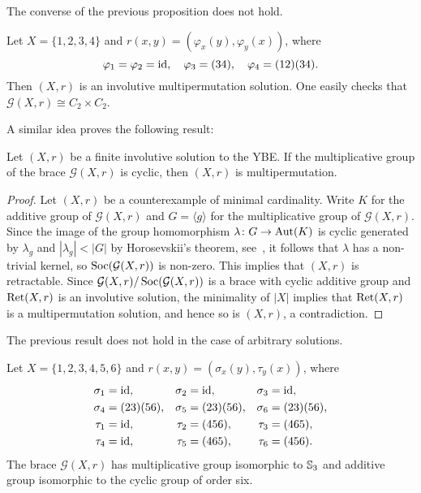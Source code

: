 The converse of the previous proposition does not hold. 

\begin{example}
	Let $X=\{1,2,3,4\}$ and $r(x,y)=(\varphi_x(y),\varphi_y(x))$, where
	\[
		\varphi_1=\varphi_2=\operatorname{id},\quad
		\varphi_3=(34),\quad
		\varphi_4=(12)(34).
 	\]
	Then $(X,r)$ is an involutive multipermutation solution. One easily checks
	that $\mathcal{G}(X,r)\cong C_2\times C_2$.
\end{example}

A similar idea proves the following result:

\begin{theorem}
\label{thm:mul_cyclic}
Let $(X,r)$ be a finite involutive solution to the YBE. If the multiplicative group 
of the brace $\mathcal{G}(X,r)$ is cyclic, then $(X,r)$ 
is multipermutation.
\end{theorem}

\begin{proof}
    Let $(X,r)$ be a counterexample of minimal cardinality. Write $K$ for the additive 
    group of $\mathcal{G}(X,r)$ and 
    $G=\langle g\rangle$ for the multiplicative group of $\mathcal{G}(X,r)$. Since 
    the image of the group homomorphism $\lambda\colon G\to\operatorname{Aut}(K)$ is cyclic generated by $\lambda_g$ and 
    $|\lambda_g|<|G|$ by Horosevskii's theorem, see~\cite[Corollary 3.3]{MR2426855}, it follows that 
    $\lambda$ has a non-trivial kernel, so $\operatorname{Soc}(\mathcal{G}(X,r))$ is non-zero.  
    This implies that $(X,r)$ is retractable. 
    Since $\mathcal{G}(X,r)/\operatorname{Soc}(\mathcal{G}(X,r))$ is a brace with cyclic 
    additive group and $\operatorname{Ret}(X,r)$ is an involutive solution, the 
    minimality of $|X|$ implies that 
    $\operatorname{Ret}(X,r)$ is a multipermutation solution, and hence so is $(X,r)$, 
    a contradiction. 
\end{proof}

The previous result does not hold in the case of arbitrary solutions.

\begin{example}
Let $X=\{1,2,3,4,5,6\}$ and $r(x,y)=(\sigma_x(y),\tau_y(x))$, where
\begin{align*}
    \sigma_1 &= \operatorname{id}, & \sigma_2&=\operatorname{id}, & \sigma_3 &= \operatorname{id},\\
    \sigma_4&=(23)(56), &\sigma_5 &= (23)(56), & \sigma_6&=(23)(56),\\
    \tau_1 &= \operatorname{id}, & \tau_2&=(456), & \tau_3 &= (465),\\
    \tau_4&=\operatorname{id}, &\tau_5 &= (465), & \tau_6&=(456).
\end{align*}
The brace $\mathcal{G}(X,r)$ has multiplicative group isomorphic to $\mathbb{S}_3$ and
additive group isomorphic to the cyclic group of order six. 
\end{example}

